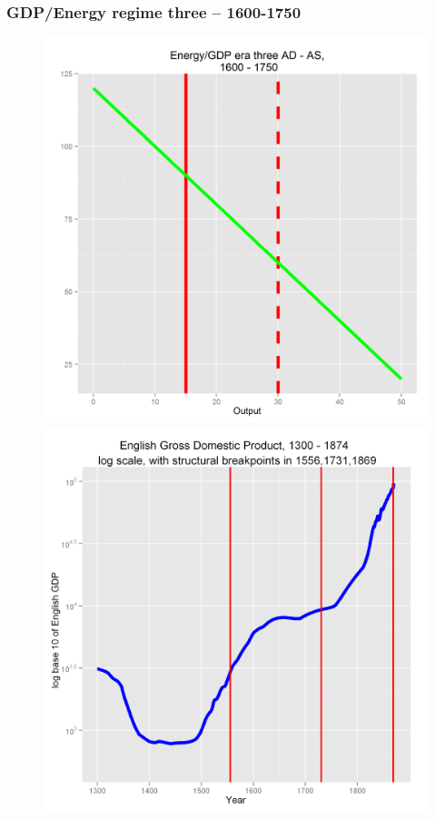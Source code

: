 \documentclass[final]{beamer}
\begin{document}
\begin{frame}
\frametitle{GDP/Energy regime three -- 1600-1750}
		\begin{figure}[p!]
		\label{fig:asad}		
		\centerline{
		\mbox{\includegraphics[height=0.5\textheight]{era3}}
		\mbox{\includegraphics[height=0.5\textheight]{gbpgdplog}}
}
\end{figure}
\end{frame}
\end{document}
